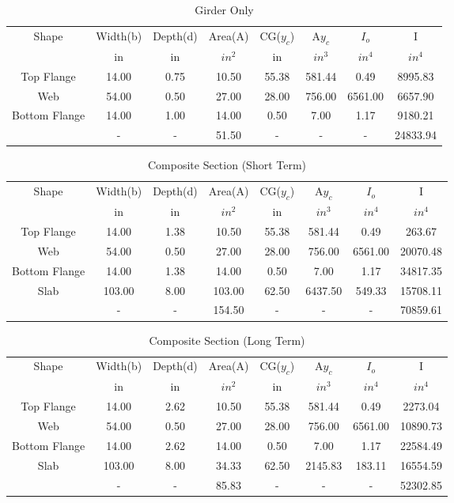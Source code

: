\documentclass[11pt]{book}
\begin{document}
\begin{table}[H]
\centering
\caption{Girder Only}\begin{tabular}{|c|c|c|c|c|c|c|c|}
\hline
Shape &Width(b)     &Depth(d)  &Area(A)   &CG($y_c$)    &A$y_c$     &$I_o$    &I      \\
      &in           &in        &$in^2$    &in           &$in^3$     &$in^4$   &$in^4$  \\
\hline
Top Flange  &14.00 &0.75 &10.50 &55.38 &581.44 &0.49 &8995.83\\ \hline
Web  &54.00 &0.50 &27.00 &28.00 &756.00 &6561.00 &6657.90\\ \hline
Bottom Flange  &14.00 &1.00 &14.00 &0.50 &7.00 &1.17 &9180.21\\ \hline
  &- &- &51.50 &- &- &- &24833.94\\ \hline
\end{tabular}
\end{table}
\begin{table}[H]
\centering
\caption{Composite Section (Short Term)}\begin{tabular}{|c|c|c|c|c|c|c|c|}
\hline
Shape &Width(b)     &Depth(d)  &Area(A)   &CG($y_c$)    &A$y_c$     &$I_o$    &I      \\
      &in           &in        &$in^2$    &in           &$in^3$     &$in^4$   &$in^4$  \\
\hline
Top Flange  &14.00 &1.38 &10.50 &55.38 &581.44 &0.49 &263.67\\ \hline
Web  &54.00 &0.50 &27.00 &28.00 &756.00 &6561.00 &20070.48\\ \hline
Bottom Flange  &14.00 &1.38 &14.00 &0.50 &7.00 &1.17 &34817.35\\ \hline
Slab &103.00 &8.00 &103.00 &62.50 &6437.50 &549.33 &15708.11\\ \hline
  &- &- &154.50 &- &- &- &70859.61\\ \hline
\end{tabular}
\end{table}
\begin{table}[H]
\centering
\caption{Composite Section (Long Term)}\begin{tabular}{|c|c|c|c|c|c|c|c|}
\hline
Shape &Width(b)     &Depth(d)  &Area(A)   &CG($y_c$)    &A$y_c$     &$I_o$    &I      \\
      &in           &in        &$in^2$    &in           &$in^3$     &$in^4$   &$in^4$  \\
\hline
Top Flange  &14.00 &2.62 &10.50 &55.38 &581.44 &0.49 &2273.04\\ \hline
Web  &54.00 &0.50 &27.00 &28.00 &756.00 &6561.00 &10890.73\\ \hline
Bottom Flange  &14.00 &2.62 &14.00 &0.50 &7.00 &1.17 &22584.49\\ \hline
Slab &103.00 &8.00 &34.33 &62.50 &2145.83 &183.11 &16554.59\\ \hline
  &- &- &85.83 &- &- &- &52302.85\\ \hline
\end{tabular}
\end{table}
\end{document}
